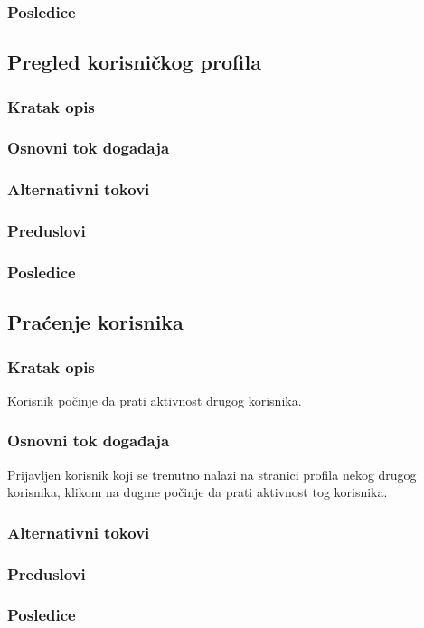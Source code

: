 \subsubsection{Posledice}



\subsection{Pregled korisničkog profila}
\label{subsec:pregled-korisnickog-profila}

\subsubsection{Kratak opis}

\subsubsection{Osnovni tok događaja}

\subsubsection{Alternativni tokovi}

\subsubsection{Preduslovi}

\subsubsection{Posledice}




\subsection{Praćenje korisnika}
\label{subsec:pracenje-korisnika}

\subsubsection{Kratak opis}
Korisnik počinje da prati aktivnost drugog korisnika.
\subsubsection{Osnovni tok događaja}
Prijavljen korisnik koji se trenutno nalazi na stranici profila nekog drugog korisnika, klikom na dugme  počinje da prati aktivnost tog korisnika.
\subsubsection{Alternativni tokovi}

\subsubsection{Preduslovi}

\subsubsection{Posledice}
